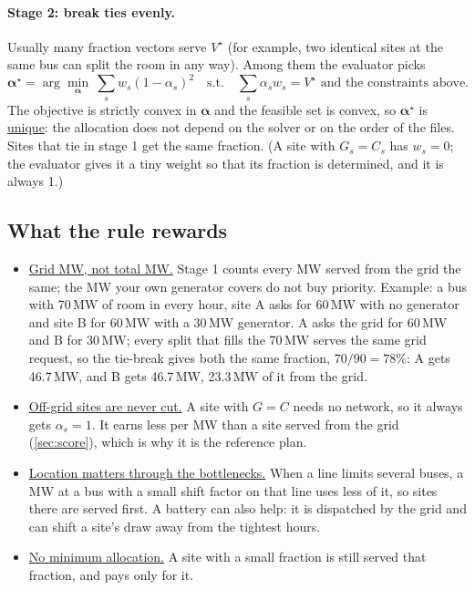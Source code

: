 \documentclass[10pt]{article}
\newcommand{\alert}[1]{{\color{alertblue}\uline{#1}}}
\newcommand{\MW}{\ensuremath{\,\mathrm{MW}}}
\begin{document}
\paragraph{Stage 2: break ties evenly.} Usually many fraction vectors serve
$V^\star$ (for example, two identical sites at the same bus can split the room
in any way). Among them the evaluator picks
\[
  \boldsymbol\alpha^\star = \arg\min_{\boldsymbol\alpha}\ \sum_s w_s (1-\alpha_s)^2
  \quad\text{s.t.}\quad \sum_s \alpha_s w_s = V^\star \text{ and the constraints above.}
\]
The objective is strictly convex in $\boldsymbol\alpha$ and the feasible set is
convex, so $\boldsymbol\alpha^\star$ is \alert{unique}: the allocation does not
depend on the solver or on the order of the files. Sites that tie in stage 1
get the same fraction. (A site with $G_s = C_s$ has $w_s = 0$; the evaluator
gives it a tiny weight so that its fraction is determined, and it is always 1.)

\subsection{What the rule rewards}

\begin{itemize}[leftmargin=*]
  \item \alert{Grid MW, not total MW.} Stage 1 counts every MW served from
    the grid the same; the MW your own generator covers do not buy priority.
    Example: a bus with 70\MW{} of room in every hour, site A asks for
    60\MW{} with no generator and site B for 60\MW{} with a 30\MW{}
    generator. A asks the grid for 60\MW{} and B for 30\MW{}; every split
    that fills the 70\MW{} serves the same grid request, so the tie-break
    gives both the same fraction, $70/90 = 78\%$: A gets 46.7\MW{}, and B
    gets 46.7\MW{}, 23.3\MW{} of it from the grid.
  \item \alert{Off-grid sites are never cut.} A site with $G = C$ needs no
    network, so it always gets $\alpha_s = 1$. It earns less per MW than a site
    served from the grid (\cref{sec:score}), which is why it is the reference
    plan.
  \item \alert{Location matters through the bottlenecks.} When a line limits
    several buses, a MW at a bus with a small shift factor on that line uses
    less of it, so sites there are served first. A battery can also help: it
    is dispatched by the grid and can shift a site's draw away from the
    tightest hours.
  \item \alert{No minimum allocation.} A site with a small fraction is still
    served that fraction, and pays only for it.
\end{itemize}
\end{document}

